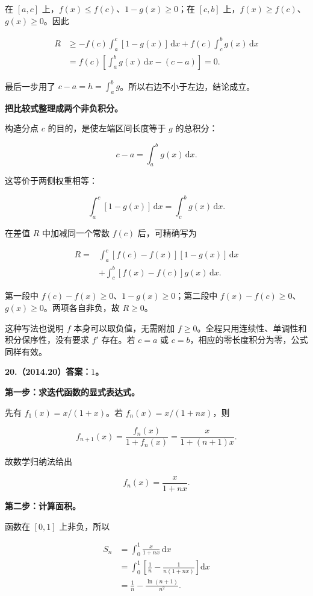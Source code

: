 \documentclass[UTF8,11pt,fontset=windows]{ctexart}
\begin{document}
在 $[a,c]$ 上，$f(x)\le f(c)$、$1-g(x)\ge0$；在 $[c,b]$ 上，$f(x)\ge f(c)$、$g(x)\ge0$。因此

$$
\begin{aligned}
R&\ge-f(c)\int_a^c[1-g(x)]\,\mathrm dx+f(c)\int_c^b g(x)\,\mathrm dx\\
&=f(c)\left[\int_a^b g(x)\,\mathrm dx-(c-a)\right]=0.
\end{aligned}
$$

最后一步用了 $c-a=h=\int_a^b g$。所以右边不小于左边，结论成立。

\textbf{把比较式整理成两个非负积分。}

构造分点 $c$ 的目的，是使左端区间长度等于 $g$ 的总积分：

$$
c-a=\int_a^b g(x)\,\mathrm dx.
$$

这等价于两侧权重相等：

$$
\int_a^c[1-g(x)]\,\mathrm dx=\int_c^b g(x)\,\mathrm dx.
$$

在差值 $R$ 中加减同一个常数 $f(c)$ 后，可精确写为

$$
\begin{aligned}
R={}&\int_a^c[f(c)-f(x)][1-g(x)]\,\mathrm dx\\
&+\int_c^b[f(x)-f(c)]g(x)\,\mathrm dx.
\end{aligned}
$$

第一段中 $f(c)-f(x)\ge0$、$1-g(x)\ge0$；第二段中 $f(x)-f(c)\ge0$、$g(x)\ge0$。两项各自非负，故 $R\ge0$。

这种写法也说明 $f$ 本身可以取负值，无需附加 $f\ge0$。全程只用连续性、单调性和积分保序性，没有要求 $f'$ 存在。若 $c=a$ 或 $c=b$，相应的零长度积分为零，公式同样有效。

\clearpage

\textbf{20.（2014.20）答案：$1$。}

\textbf{第一步：求迭代函数的显式表达式。}

先有 $f_1(x)=x/(1+x)$。若 $f_n(x)=x/(1+nx)$，则

$$
f_{n+1}(x)=\frac{f_n(x)}{1+f_n(x)}
=\frac{x}{1+(n+1)x}.
$$

故数学归纳法给出

$$
f_n(x)=\frac{x}{1+nx}.
$$

\textbf{第二步：计算面积。}

函数在 $[0,1]$ 上非负，所以

$$
\begin{aligned}
S_n&=\int_0^1\frac{x}{1+nx}\,\mathrm dx\\
&=\int_0^1\left[\frac1n-\frac1{n(1+nx)}\right]\mathrm dx\\
&=\frac1n-\frac{\ln(n+1)}{n^2}.
\end{aligned}
$$
\end{document}

